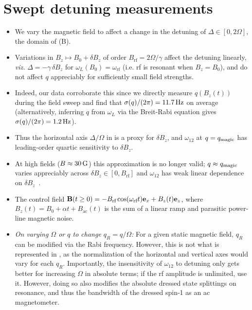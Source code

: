 \documentclass[aps,prl,reprint,superscriptaddress,floatfix]{revtex4-1}
\begin{document}
\section{Swept detuning measurements}
\label{sec:swept_detuning}
\begin{itemize}
    \item We vary the magnetic field to affect a change in the detuning of $\Delta \in [0, 2\Omega]$, the domain of (B).
    \item Variations in $B_z \mapsto B_0 + \delta B_z$ of order $B_{\text{rf}} = 2\Omega/\gamma$ affect the detuning linearly, \textit{viz.} $\Delta = - \gamma \, \delta B_z$ for $\omega_L(B_0) = \omega_{\text{rf}}$ (i.e. rf is resonant when $B_z=B_0$), and do not affect $q$ appreciably for sufficiently small field strengths.
    \item Indeed, our data corroborate this since we directly measure $q(B_z(t))$ during the field sweep and find that $\sigma(q)/(2\pi) = \unit[11.7]{Hz}$ on average (alternatively, inferring $q$ from $\omega_L$ via the Breit-Rabi equation gives $\sigma(q)/(2\pi) = \unit[1.2]{Hz}$).
    \item Thus the horizontal axis $\Delta/\Omega$ in  is a proxy for $\delta B_z$, and $\omega_{12}$ at $q=q_{\text{magic}}$ has leading-order quartic sensitivity to $\delta B_z$.
        \item At high fields ($B\approx \unit[30]{G}$) this approximation is no longer valid; $q \approx q_{\text{magic}}$ varies appreciably across $\delta B_z \in [0, B_{\text{rf}}]$ and $\omega_{12}$ has weak linear dependence on $\delta B_z$~\cite{lundblad_synthetic_2017}.
    \item[\checkmark]  The control field $\mathbf{B}(t \geq 0) = -B_{\text{rf}} \cos (\omega_{\text{rf}} t) \mathbf{e}_x + B_z(t) \mathbf{e}_z$, where $B_z(t) = B_0 + \alpha t + B_{\text{ac}}(t)$ is the sum of a linear ramp and parasitic power-line magnetic noise.
    \item[\checkmark] \textit{On varying $\Omega$ or $q$ to change $q_R=q/\Omega$:}
    For a given static magnetic field, $q_R$ can be modified via the Rabi frequency.
    However, this is not what is represented in , as the normalization of the horizontal and vertical axes would vary for each $q_R$.
    Importantly, the insensitivity of $\omega_{12}$ to detuning only gets better for increasing $\Omega$ in absolute terms; if the rf amplitude is unlimited, use it.
    However, doing so also modifies the absolute dressed state splittings on resonance, and thus the bandwidth of the dressed spin-1 as an ac magnetometer.

\end{itemize}
\end{document}
